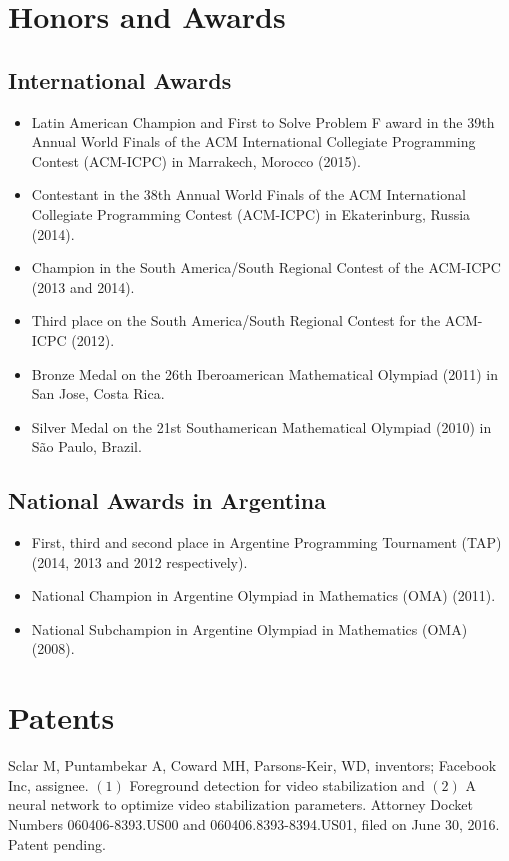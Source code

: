 \documentclass [a4paper, 11pt]{article}
\begin{document}
\section* {Honors and Awards}

\subsection* {International Awards}

\begin{itemize} \itemsep.05cm
	\item[] Latin American Champion and First to Solve Problem F award in the 39th Annual World Finals of the ACM International Collegiate Programming Contest (ACM-ICPC) in Marrakech, Morocco (2015).
	\item[] Contestant in the 38th Annual World Finals of the ACM International Collegiate Programming Contest (ACM-ICPC) in Ekaterinburg, Russia (2014).
	\item[] Champion in the South America/South Regional Contest of the ACM-ICPC (2013 and 2014).
	\item[] Third place on the South America/South Regional Contest for the ACM-ICPC (2012).
	\item[] Bronze Medal on the 26th Iberoamerican Mathematical Olympiad (2011) in San Jose, Costa Rica.
	\item[] Silver Medal on the 21st Southamerican Mathematical Olympiad (2010) in S\~ao Paulo, Brazil. 
\end{itemize}

\subsection* {National Awards in Argentina}

\begin{itemize} \itemsep.05cm
    \item[] First, third and second place in Argentine Programming Tournament (TAP) (2014, 2013 and 2012 respectively).
	\item[] National Champion in Argentine Olympiad in Mathematics (OMA) (2011).
	\item[] National Subchampion in Argentine Olympiad in Mathematics (OMA) (2008).
	
\end{itemize}

\newpage
\section* {Patents}
Sclar M, Puntambekar A, Coward MH, Parsons-Keir, WD, inventors; Facebook Inc,
assignee. $(1)$ Foreground detection for video stabilization and $(2)$ A neural network to optimize video stabilization parameters. Attorney Docket Numbers 060406-8393.US00 and 060406.8393-8394.US01, filed on June 30, 2016. Patent pending.
\end{document}
